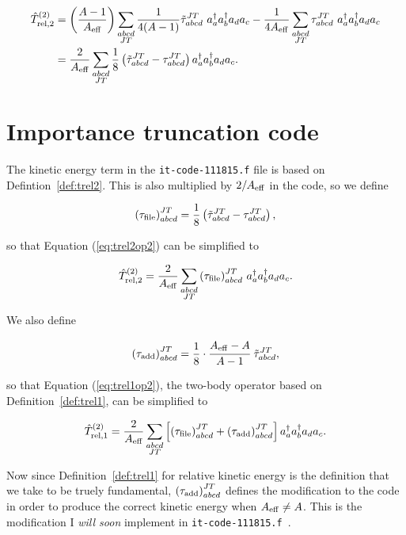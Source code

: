 \documentclass{article}
\def\aeff{A_{\rm{eff}}}
\def\trelopi_#1^#2{\hat{T}_{\rm{rel}, #1}^{#2}}
\def\creop{a^{\dagger}}
\def\annop{a}
\begin{document}
\begin{equation}\label{eq:trel2op2}
  \begin{aligned}
    \trelopi_2^{(2)} &= \left(\frac{A-1}{\aeff}\right)
    \displaystyle\sum_{\substack{abcd\\JT}} \frac{1}{4(A-1)}
    \tilde{\tau}_{abcd}^{JT}~\creop_a\creop_b\annop_d\annop_c
    -\frac{1}{4\aeff} \displaystyle\sum_{\substack{abcd\\JT}}
    \tau_{abcd}^{JT}~\creop_a\creop_b\annop_d\annop_c\\
    &= \frac{2}{\aeff} \displaystyle\sum_{\substack{abcd\\JT}}
    \frac{1}{8}\left( \tilde{\tau}_{abcd}^{JT} - \tau_{abcd}^{JT} \right)
    \creop_a\creop_b\annop_d\annop_c.
  \end{aligned}
\end{equation}

\section{Importance truncation code}

The kinetic energy term in the \texttt{it-code-111815.f} file is based
on Defintion~\ref{def:trel2}. This is also multiplied by $2/A_{\rm{eff}}$ in
the code, so we define

\begin{equation}
  {(\tau_{\rm{file}})}_{abcd}^{JT} = \frac{1}{8}
  \left( \tilde{\tau}_{abcd}^{JT} - \tau_{abcd}^{JT} \right),
\end{equation}

so that Equation (\ref{eq:trel2op2}) can be simplified to

\begin{equation}
  \trelopi_2^{(2)} = \frac{2}{\aeff}
  \displaystyle\sum_{\substack{abcd\\JT}} {(\tau_{\rm{file}})}_{abcd}^{JT}
  ~\creop_a\creop_b\annop_d\annop_c.
\end{equation}

We also define

\begin{equation}
  {(\tau_{\rm{add}})}_{abcd}^{JT} = \frac{1}{8}\cdot
  \cfrac{\aeff-A}{A-1}~\tilde{\tau}_{abcd}^{JT},
\end{equation}

so that Equation (\ref{eq:trel1op2}), the two-body operator based on
Definition~\ref{def:trel1}, can be simplified to

\begin{equation}
  \trelopi_1^{(2)} = \frac{2}{\aeff}
  \displaystyle\sum_{\substack{abcd\\JT}} \left[ 
  {(\tau_{\rm{file}})}_{abcd}^{JT} + {(\tau_{\rm{add}})}_{abcd}^{JT}
  \right]\creop_a\creop_b\annop_d\annop_c.
\end{equation}

Now since Definition~\ref{def:trel1} for relative kinetic energy is the
definition that we take to be truely fundamental,
${(\tau_{\rm{add}})}_{abcd}^{JT}$ defines
the modification to the code in order to produce the correct
kinetic energy when $\aeff\neq A$.
This is the modification I \textit{will soon} implement in
\texttt{it-code-111815.f}~\cite{github}.



\end{document}
